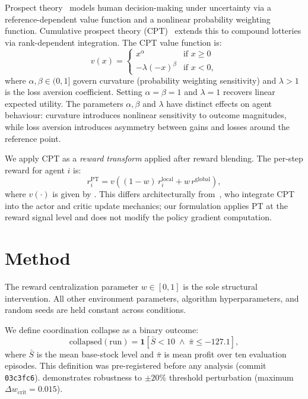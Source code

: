 \documentclass[11pt]{article}
\newcommand{\wcrit}{w_{\mathrm{crit}}}
\newcommand{\PT}{\mathrm{PT}}
\begin{document}
Prospect theory~\citep{kahneman1979} models human decision-making under
uncertainty via a reference-dependent value function and a nonlinear
probability weighting function.
Cumulative prospect theory (CPT)~\citep{tversky1992} extends this to
compound lotteries via rank-dependent integration.
The CPT value function is:
\begin{equation}
  v(x) =
  \begin{cases}
    x^{\alpha} & \text{if } x \geq 0 \\
    -\lambda(-x)^{\beta} & \text{if } x < 0,
  \end{cases}
  \label{eq:cpt}
\end{equation}
where $\alpha, \beta \in (0,1]$ govern curvature (probability weighting
sensitivity) and $\lambda > 1$ is the loss aversion coefficient.
Setting $\alpha{=}\beta{=}1$ and $\lambda{=}1$ recovers linear expected
utility.
The parameters $\alpha, \beta$ and $\lambda$ have distinct effects on
agent behaviour: curvature introduces nonlinear sensitivity to outcome
magnitudes, while loss aversion introduces asymmetry between gains and
losses around the reference point.

We apply CPT as a \emph{reward transform} applied after reward blending.
The per-step reward for agent $i$ is:
\begin{equation}
  r_i^{\PT} = v\!\left((1-w)\,r_i^{\mathrm{local}} + w\,r^{\mathrm{global}}\right),
  \label{eq:reward}
\end{equation}
where $v(\cdot)$ is given by .
This differs architecturally from~\citet{lalmohammed2025}, who integrate
CPT into the actor and critic update mechanics; our formulation applies PT
at the reward signal level and does not modify the policy gradient
computation.

\section{Method}
\label{sec:method}

The reward centralization parameter $w \in [0,1]$ is the sole structural
intervention.
All other environment parameters, algorithm hyperparameters, and random
seeds are held constant across conditions.

We define coordination collapse as a binary outcome:
\begin{equation}
  \mathrm{collapsed}(\text{run}) = \mathbf{1}\!\left[
    \bar{S} < 10 \;\wedge\; \bar{\pi} \leq -127.1
  \right],
  \label{eq:collapse}
\end{equation}
where $\bar{S}$ is the mean base-stock level and $\bar{\pi}$ is mean
profit over ten evaluation episodes.
This definition was pre-registered before any analysis (commit
\texttt{03c3fc6}).
 demonstrates robustness to $\pm 20\%$
threshold perturbation (maximum $\Delta\wcrit = 0.015$).
\end{document}
